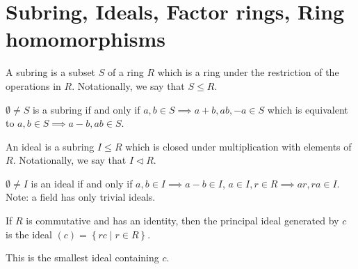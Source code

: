 \documentclass{memoir}
\begin{document}
\section{Subring, Ideals, Factor rings, Ring homomorphisms}	
\begin{defn}[Subring]
	A subring is a subset \(S\) of a ring \(R\) which is a ring under the restriction of the operations in \(R\). Notationally, we say that \(S\leq R\).
\end{defn}
\(\emptyset \neq S\) is a subring if and only if \(a,b \in S \implies a+b, ab, -a \in S\) which is equivalent to \(a,b \in S \implies a-b, ab \in S\).
\begin{defn}[Ideal]
	An ideal is a subring \(I \leq R\) which is closed under multiplication with elements of \(R\). Notationally, we say that \(I \triangleleft R\).
\end{defn}
\(\emptyset\neq I\) is an ideal if and only if \(a,b \in I \implies a-b \in I\), \(a \in I, r \in R \implies ar, ra \in I\).\\
Note: a field has only trivial ideals.\\

\begin{defn}
	If \(R\) is commutative and has an identity, then the principal ideal generated by \(c\) is the ideal \((c) = \left\{rc \mid r \in R \right\} \). 
\end{defn}
This is the smallest ideal containing \(c\).
\end{document}
